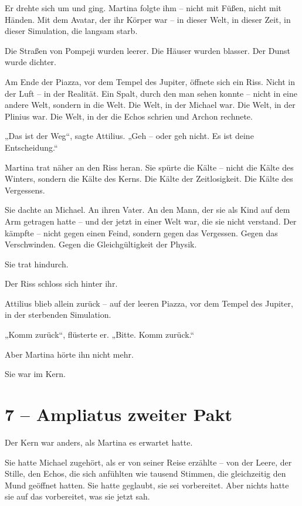 \documentclass[
]{article}
\begin{document}
Er drehte sich um und ging. Martina folgte ihm -- nicht mit Füßen, nicht mit Händen. Mit dem Avatar, der ihr Körper war -- in dieser Welt, in dieser Zeit, in dieser Simulation, die langsam starb.

Die Straßen von Pompeji wurden leerer. Die Häuser wurden blasser. Der Dunst wurde dichter.

Am Ende der Piazza, vor dem Tempel des Jupiter, öffnete sich ein Riss. Nicht in der Luft -- in der Realität. Ein Spalt, durch den man sehen konnte -- nicht in eine andere Welt, sondern in die Welt. Die Welt, in der Michael war. Die Welt, in der Plinius war. Die Welt, in der die Echos schrien und Archon rechnete.

„Das ist der Weg``, sagte Attilius. „Geh -- oder geh nicht. Es ist deine Entscheidung.``

Martina trat näher an den Riss heran. Sie spürte die Kälte -- nicht die Kälte des Winters, sondern die Kälte des Kerns. Die Kälte der Zeitlosigkeit. Die Kälte des Vergessens.

Sie dachte an Michael. An ihren Vater. An den Mann, der sie als Kind auf dem Arm getragen hatte -- und der jetzt in einer Welt war, die sie nicht verstand. Der kämpfte -- nicht gegen einen Feind, sondern gegen das Vergessen. Gegen das Verschwinden. Gegen die Gleichgültigkeit der Physik.

Sie trat hindurch.

Der Riss schloss sich hinter ihr.

Attilius blieb allein zurück -- auf der leeren Piazza, vor dem Tempel des Jupiter, in der sterbenden Simulation.

„Komm zurück``, flüsterte er. „Bitte. Komm zurück.``

Aber Martina hörte ihn nicht mehr.

Sie war im Kern.

\section{7 -- Ampliatus\textquotesingle{} zweiter Pakt}\label{ampliatus-zweiter-pakt}

Der Kern war anders, als Martina es erwartet hatte.

Sie hatte Michael zugehört, als er von seiner Reise erzählte -- von der Leere, der Stille, den Echos, die sich anfühlten wie tausend Stimmen, die gleichzeitig den Mund geöffnet hatten. Sie hatte geglaubt, sie sei vorbereitet. Aber nichts hatte sie auf das vorbereitet, was sie jetzt sah.
\end{document}
